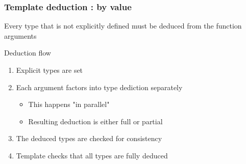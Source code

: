 \documentclass[14pt]{beamer}
\begin{document}
\begin{frame}[fragile]
  \frametitle{Template deduction : by value}

  Every type that is not explicitly defined must be deduced from the function
  arguments

  \hspace{.25cm}

  Deduction flow

  \begin{enumerate} \changefontsize{12pt}\itshape
    \item Explicit types are set
    \item Each argument factors into type dediction separately
    \begin{itemize} \changefontsize{10pt}\itshape
      \item This happens "in parallel"
      \item Resulting deduction is either full or partial
    \end{itemize}
    \item The deduced types are checked for consistency
    \item Template checks that all types are fully deduced
  \end{enumerate}

\end{frame}
\end{document}
